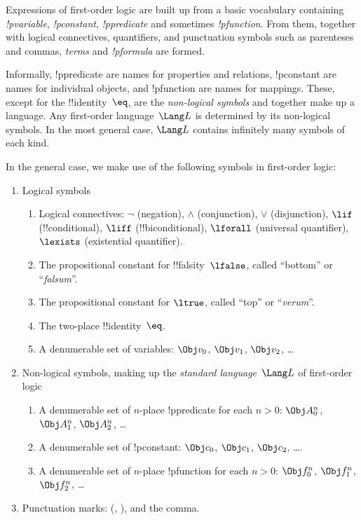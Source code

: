\documentclass[../../include/open-logic-section]{subfiles}
\begin{document}


\begin{explain}
Expressions of first-order logic are built up from a basic vocabulary
containing \emph{!p{variable}}, \emph{!p{constant}},
\emph{!p{predicate}} and sometimes \emph{!p{function}}.
  From them, together with logical connectives, quantifiers, and
  punctuation symbols such as parenteses and commas, \emph{terms} and
  \emph{!p{formula}} are formed.

Informally, !p{predicate} are names for properties and relations,
!p{constant} are names for individual objects, and !p{function} are names
for mappings.  These, except for the !!{identity}~$\eq$, are the
\emph{non-logical symbols} and together make up a language.  Any
first-order language~$\Lang L$ is determined by its non-logical
symbols.  In the most general case, $\Lang L$ contains infinitely
many symbols of each kind.
\end{explain}

In the general case, we make use of the following symbols in
first-order logic:

\begin{enumerate}
\item Logical symbols
\begin{enumerate}
\item Logical connectives: $\lnot$ (negation), $\land$ (conjunction),
  $\lor$ (disjunction), $\lif$ (!!{conditional}), $\liff$ (!!{biconditional}),
  $\lforall$ (universal quantifier), $\lexists$ (existential
  quantifier).
\item The propositional constant for !!{falsity}~$\lfalse$, called ``bottom'' or ``\emph{falsum}''.
\item The propositional constant for $\ltrue$, called ``top'' or ``\emph{verum}''.
\item The two-place !!{identity}~$\eq$.
\item A denumerable set of variables: $\Obj v_0$, $\Obj v_1$, $\Obj
  v_2$, \dots
\end{enumerate}
\item Non-logical symbols, making up the \emph{standard
  language}~$\Lang L$ of first-order logic
\begin{enumerate}
\item A denumerable set of $n$-place !p{predicate} for each $n>0$: $\Obj
  A^n_0$, $\Obj A^n_1$, $\Obj A^n_2$, \dots
\item A denumerable set of !p{constant}: $\Obj c_0$, $\Obj c_1$, $\Obj
  c_2$, \dots.
\item A denumerable set of $n$-place !p{function} for each $n>0$:
  $\Obj f^n_0$, $\Obj f^n_1$, $\Obj f^n_2$, \dots
\end{enumerate}
\item Punctuation marks: (, ), and the comma.
\end{enumerate}
\end{document}
